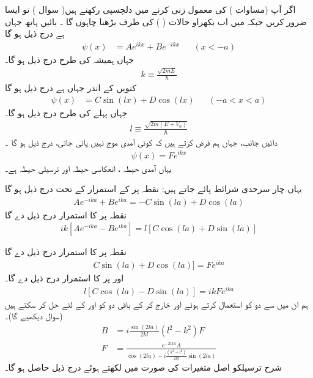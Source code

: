  اگر آپ  (مساوات ) کی  معمول زنی کرنے   میں دلچسپی رکھتے ہیں( سوال ) تو ایسا ضرور کریں جبکہ میں اب بکھراو حالات ( ) کی طرف بڑھنا چاہوں گا ۔ بائیں ہاتھ جہاں ہے درج ذیل ہو گا 
\begin{align}
\psi(x)&=Ae^{i k x}+Be^{-i k x} && (x<-a) 
\end{align}
 جہاں ہمیشہ کی طرح درج ذیل ہو گا۔
 \begin{align}
 k\equiv \frac{\sqrt{2mE}}{\hslash} 
 \end{align} 
 کنویں  کے اندر جہاں ہے درج ذیل ہو گا
\begin{align}
\psi(x)&=C\sin(lx)+D\cos(lx)&& (-a<x<a)
 \end{align}
 جہاں پہلے کی طرح درج ذیل ہو گا۔
 \begin{align}
 l\equiv \frac{\sqrt{2m(E+V_{0})}}{\hslash}
 \end{align}
  دائیں جانب، جہاں ہم فرض کرتے ہیں کہ کوئی آمدی موج نہیں پائی جاتی، درج ذیل ہو گا ۔
 \begin{align}
 \psi(x)=Fe^{i k x} 
 \end{align}
 یہاں آمدی حیطہ ، انعکاسی حیطہ  اور ترسیلی حیطہ  ہے۔ 
 
 یہاں چار سرحدی شرائط پائے جاتے ہیں: نقطہ  پر  کے استمرار کے تحت درج ذیل ہو گا
\begin{align}\label{مساوات_شروڈنگر_اے}
Ae^{-ika}+Be^{ika} = -C\sin(la)+D\cos(la)
 \end{align}
نقطہ پر کا استمرار درج ذیل دے گا
\begin{align}\label{مساوات_شروڈنگر_اے_بی}
ik[Ae^{-ika}-Be^{ika}] =l[C\cos(la)+D\sin(la)] 
\end{align}

نقطہ  پر کا استمرار درج ذیل دے گا 
\begin{align}\label{مساوات_شروڈنگر_سی}
C\sin (la)+D\cos(la)]=Fe^{ika} 
\end{align}
اور  پر کا استمرار درج ذیل دے گا۔
\begin{align}\label{مساوات_شروڈنگر_ڈی}
l[C\cos(la)-D\sin(la)]=ikFe^{ika} 
\end{align}
 ہم ان میں سے دو کو استعمال کرتے ہوئے  اور  خارج کر کے باقی دو کو  اور  کے لئے حل کر سکتے ہیں (سوال  دیکھیے گا)۔
\begin{align}
B&=i\frac{\sin(2la)}{2kl}(l^{2}-k^{2})F \label{مساوات_شروڈنگر_بی}\\
F&=\frac{e^{-2ika}A}{\cos(2la)-i\frac{(k^{2}+l^{2})}{2kl}\sin(2la)}\label{مساوات_شروڈنگر_ایف}
\end{align}
 شرح ترسیلکو اصل متغیرات کی صورت میں لکھتے ہوئے درج ذیل حاصل ہو گا۔


